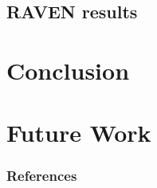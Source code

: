 \documentclass[9pt]{beamer}
\begin{document}
\subsection{RAVEN results}


\section{Conclusion}

\section{Future Work}


\begin{frame}[allowframebreaks]
  \frametitle{References}
  
  {\footnotesize  }

\end{frame}

\end{document}
